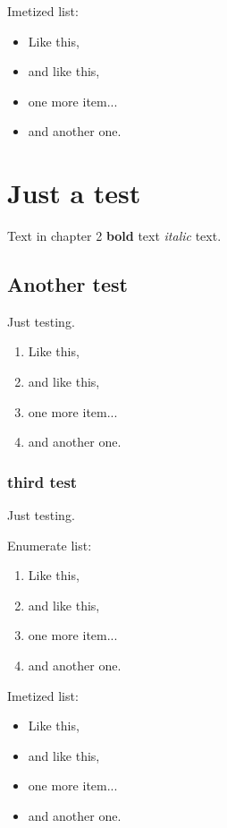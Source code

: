 \documentclass{article}
\begin{document}
Imetized list:

\begin{itemize}
\item Like this,
\item and like this,
\item one more item...
\item and another one.
\end{itemize}

\chapter{Just a test}

Text in chapter 2 \textbf{bold} text \emph{italic} text.

\section{Another test}

Just testing.

\begin{enumerate}
\item Like this,
\item and like this,
\item one more item...
\item and another one.
\end{enumerate}

\subsection{third test}

Just testing.

Enumerate list:

\begin{enumerate}
\item Like this,
\item and like this,
\item one more item...
\item and another one.
\end{enumerate}

Imetized list:

\begin{itemize}
\item Like this,
\item and like this,
\item one more item...
\item and another one.
\end{itemize}
\end{document}

